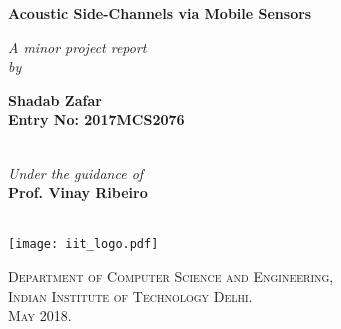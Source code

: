\begin{titlepage}
\begin{center}

\LARGE{\textsf{\bfseries Acoustic Side-Channels via Mobile Sensors}}\\
\vspace{30pt}
\normalsize

\emph{A minor project report} \\

\vspace{30pt}
    \emph {by}\\
\vspace{30pt}

\Large{\textsf{\bfseries Shadab Zafar}} \\
{\normalsize \textsf{\bfseries Entry No: 2017MCS2076}}\\

\vspace{15pt}

\ \\
{\normalsize \emph {Under the guidance of}}
\ \\
\Large{\textsf{\bfseries Prof. Vinay Ribeiro}} \\
\ \\

\vspace{80pt}

\texttt{[image: iit\_logo.pdf]} \\
\vspace{10pt}

\large{\textsc{Department of Computer Science and Engineering,\\
Indian Institute of Technology Delhi.\\ May 2018.}}
\end{center}
\end{titlepage}
